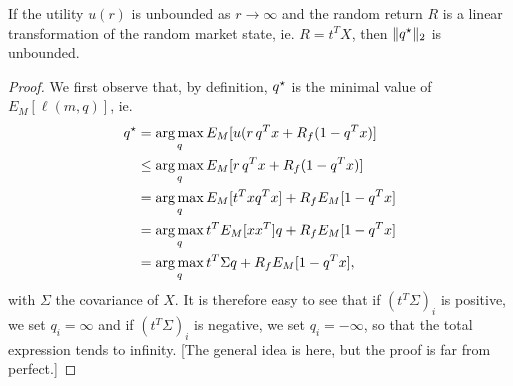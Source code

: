 \documentclass[11pt]{article}
\begin{document}
\begin{claim}
  If the utility $u(r)$ is unbounded as $r\to\infty$ and the random return $R$ is a linear
  transformation of the random market state, ie. $R = t^T X$, then $\|{q^\star}\|_2$ is
  unbounded.
\end{claim}
\begin{proof}
  We first observe that, by definition, ${q^\star}$ is the minimal value of $E_M[\ell(m,q)]$, ie.
  \begin{align*}
    {q^\star} &= \operatorname*{arg\,max}_q E_M[u(r\,q^{T}x + R_f(1-q^{T}x)]\\
    &\leq \operatorname*{arg\,max}_q E_M[r\,q^Tx + R_f(1-q^Tx)]\\
    &= \operatorname*{arg\,max}_q E_M[t^Txq^Tx] + R_fE_M[1-q^Tx]\\
    &= \operatorname*{arg\,max}_q t^T E_M[xx^T] q + R_fE_M[1-q^Tx]\\
    &= \operatorname*{arg\,max}_q t^T\Sigma q + R_fE_M[1-q^Tx],
  \end{align*}
with $\Sigma$ the covariance of $X$. It is therefore easy to see that if $(t^T\Sigma)_i$
is positive, we set $q_i=\infty$ and if $(t^T\Sigma)_i$ is negative, we set $q_i=-\infty$,
so that the total expression tends to infinity. [The general idea is here, but the proof
is far from perfect.]
\end{proof}
\end{document}
